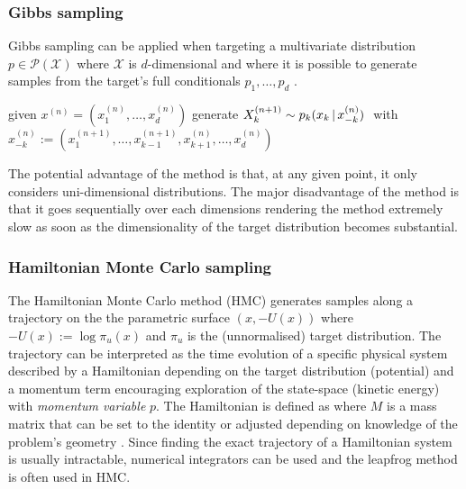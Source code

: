 \subsubsection{Gibbs sampling}

Gibbs sampling can be applied when targeting a multivariate distribution $p\in \mathcal P(\mathcal X)$ where $\mathcal X$ is $d$-dimensional and where it is possible to generate samples from the target's full conditionals $p_{1}, \dots, p_{d}$ \citep[chapter 7]{robert04}.

\begin{algorithm}[!h]\small
	\caption{\label{alg:gibbs-alg}}
	\begin{algorithmic}[1]
		\State given $x^{(n)}=(x_{1}^{(n)},\dots,x_{d}^{(n)})$
			\State generate $X^{(n+1)}_{k} \sim p_{k}(x_{k}\,|\, x^{(n)}_{-k})$ \,\,with $x_{-k}^{(n)}:=(x_{1}^{(n+1)},\dots,x_{k-1}^{(n+1)},x_{k+1}^{(n)},\dots,x_{d}^{(n)})$
		\EndFor
	\end{algorithmic}
\end{algorithm}

The potential advantage of the method is that, at any given point, it only considers uni-dimensional distributions. 
The major disadvantage of the method is that it goes sequentially over each dimensions rendering the method extremely slow as soon as the dimensionality of the target distribution becomes substantial.


\subsubsection{Hamiltonian Monte Carlo sampling}

The Hamiltonian Monte Carlo method (HMC) generates samples along a trajectory on the the parametric surface $(x, -U(x))$ where $-U(x):=\log \pi_{u}(x)$ and $\pi_{u}$ is the (unnormalised) target distribution.
The trajectory can be interpreted as the time evolution of a specific physical system described by a Hamiltonian depending on the target distribution (potential) and a momentum term encouraging exploration of the state-space (kinetic energy) with \emph{momentum variable} $p$. The Hamiltonian is defined as
where $M$ is a mass matrix that can be set to the identity or adjusted depending on knowledge of the problem's geometry \citep{betancourt17, barp18}. 
Since finding the exact trajectory of a Hamiltonian system is usually intractable, numerical integrators can be used and the leapfrog method is often used in HMC.

